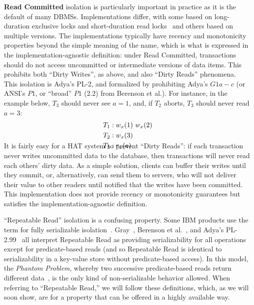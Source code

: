 \textbf{Read Committed} isolation is particularly important in
practice as it is the default of many DBMSs. Implementations differ,
with some based on long-duration exclusive locks and short-duration
read locks~\cite{gray-isolation} and others based on multiple
versions. The implementations typically have recency and monotonicity
properties beyond the simple meaning of the name, which is what is
expressed in the implementation-agnostic definition: under Read
Committed, transactions should do not access uncommitted or
intermediate versions of data items. This prohibits both ``Dirty
Writes'', as above, and also ``Dirty Reads'' phenomena.  This
isolation is Adya's PL-2, and formalized by prohibiting Adya's $G1a-c$
(or ANSI's $P1$, or ``broad'' $P1$ (2.2) from Berenson et al.). For
instance, in the example below, $T_3$ should never see $a=1$, and, if
$T_2$ aborts, $T_3$ should never read $a=3$:
\vspace{-.5em}
\begin{align*}
\small
T_1 &: w_x(1)~w_x(2)
\\T_2 &: w_x(3)\\
T_3 &: r_x(a)\\[-2em]
\end{align*}
It is fairly easy for a HAT system to prevent ``Dirty Reads'': if each
transaction never writes uncommitted data to the database, then
transactions will never read each others' dirty data. As a simple
solution, clients can buffer their writes until they commit, or,
alternatively, can send them to servers, who will not deliver their
value to other readers until notified that the writes have been
committed. This implementation does not provide recency or
monotonicity guarantees but satisfies the implementation-agnostic
definition.

``Repeatable Read'' isolation is a confusing property. Some IBM
products use the term for fully serializable
isolation~\cite{hat-hotos}. Gray~\cite{gray-isolation}, Berenson et
al.~\cite{ansicritique}, and Adya's PL-2.99~\cite{adya} all interpret
Repeatable Read as providing serializability for all operations except
for predicate-based reads (and so Repeatable Read is identical to
serializability in a key-value store without predicate-based
access). In this model, the \textit{Phantom Problem}, whereby two
successive predicate-based reads return different
data~\cite{gray-isolation}, is the only kind of non-serializable
behavior allowed. When referring to ``Repeatable Read,'' we will
follow these definitions, which, as we will soon show, are for a
property that can be offered in a highly available way.


